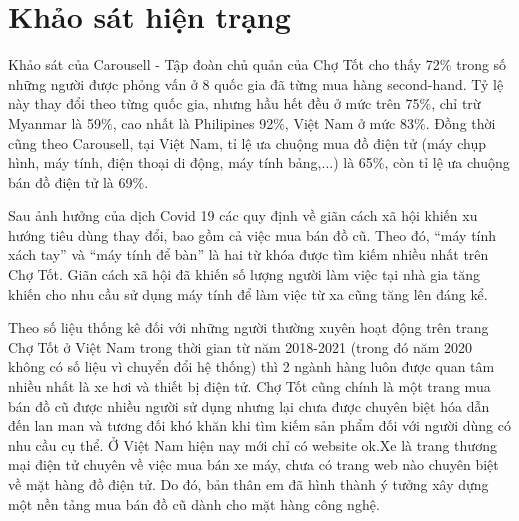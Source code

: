\documentclass[../DoAn.tex]{subfiles}
\begin{document}
\section{Khảo sát hiện trạng}
\label{section:2.1}
Khảo sát của Carousell\cite{carousell} - Tập đoàn chủ quản của Chợ Tốt cho thấy 72$\%$ trong số những người được phỏng vấn ở 8 quốc gia đã từng mua hàng second-hand. Tỷ lệ này thay đổi theo từng quốc gia, nhưng hầu hết đều ở mức trên 75$\%$, chỉ trừ Myanmar là 59$\%$, cao nhất là Philipines 92$\%$, Việt Nam ở mức 83$\%$. Đồng thời cũng theo Carousell, tại Việt Nam, tỉ lệ ưa chuộng mua đồ điện tử (máy chụp hình, máy tính, điện thoại di động, máy tính bảng,...) là 65$\%$, còn tỉ lệ ưa chuộng bán đồ điện tử là 69$\%$.

Sau ảnh hưởng của dịch Covid 19 các quy định về giãn cách xã hội khiến xu hướng tiêu dùng thay đổi, bao gồm cả việc mua bán đồ cũ. Theo đó, “máy tính xách tay” và “máy tính để bàn” là hai từ khóa được tìm kiếm nhiều nhất trên Chợ Tốt. Giãn cách xã hội đã khiến số lượng người làm việc tại nhà gia tăng khiến cho nhu cầu sử dụng máy tính để làm việc từ xa cũng tăng lên đáng kể.

Theo số liệu thống kê đối với những người thường xuyên hoạt động trên trang Chợ Tốt ở Việt Nam trong thời gian từ năm 2018-2021 (trong đó năm 2020 không có số liệu vì chuyển đổi hệ thống) thì 2 ngành hàng luôn được quan tâm nhiều nhất là xe hơi và thiết bị điện tử. Chợ Tốt cũng chính là một trang mua bán đồ cũ được nhiều người sử dụng nhưng lại chưa được chuyên biệt hóa dẫn đến lan man và tương đối khó khăn khi tìm kiếm sản phẩm đối với người dùng có nhu cầu cụ thể. Ở Việt Nam hiện nay mới chỉ có website ok.Xe là trang thương mại điện tử chuyên về việc mua bán xe máy, chưa có trang web nào chuyên biệt về mặt hàng đồ điện tử. Do đó, bản thân em đã hình thành ý tưởng xây dựng một nền tảng mua bán đồ cũ dành cho mặt hàng công nghệ. 
\end{document}
